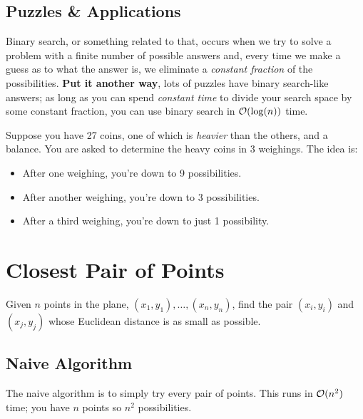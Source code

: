 \documentclass[letterpaper]{article}
\begin{document}
\subsection{Puzzles \& Applications}
\begin{mdframed}[]
    Binary search, or something related to that, occurs when we try to solve a problem with a finite number of possible answers and, every time we make a guess as to what the answer is, we eliminate a \emph{constant fraction} of the possibilities. \textbf{Put it another way}, lots of puzzles have binary search-like answers; as long as you can spend \emph{constant time} to divide your search space by some constant fraction, you can use binary search in $\mathcal{O}(\log(n))$ time.  
\end{mdframed}
Suppose you have 27 coins, one of which is \emph{heavier} than the others, and a balance. You are asked to determine the heavy coins in 3 weighings. The idea is: 
\begin{itemize}
    \item After one weighing, you're down to 9 possibilities. 
    \item After another weighing, you're down to 3 possibilities.
    \item After a third weighing, you're down to just 1 possibility. 
\end{itemize}







\section{Closest Pair of Points}
Given $n$ points in the plane, $(x_1, y_1), \dots, (x_n, y_n)$, find the pair $(x_i, y_i)$ and $(x_j, y_j)$ whose Euclidean distance is as small as possible. 

\subsection{Naive Algorithm}
The naive algorithm is to simply try every pair of points. This runs in $\mathcal{O}(n^2)$ time; you have $n$ points so $n^2$ possibilities. 
\end{document}
